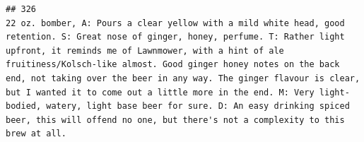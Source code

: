 \documentclass[
  a4paper,
]{article}
\begin{document}
\begin{verbatim}
## 326                                                                                                                                                                                                                                                                                                                                                                                                                                                                                                                                                                                                                                                                                                                                                                                                                                                                                                                                                                                                                                                                                                                                                                                                                                                                                                                                                                                                                                                                                                                                                                                   22 oz. bomber, A: Pours a clear yellow with a mild white head, good retention. S: Great nose of ginger, honey, perfume. T: Rather light upfront, it reminds me of Lawnmower, with a hint of ale fruitiness/Kolsch-like almost. Good ginger honey notes on the back end, not taking over the beer in any way. The ginger flavour is clear, but I wanted it to come out a little more in the end. M: Very light-bodied, watery, light base beer for sure. D: An easy drinking spiced beer, this will offend no one, but there's not a complexity to this brew at all.

\end{verbatim}
\end{document}
